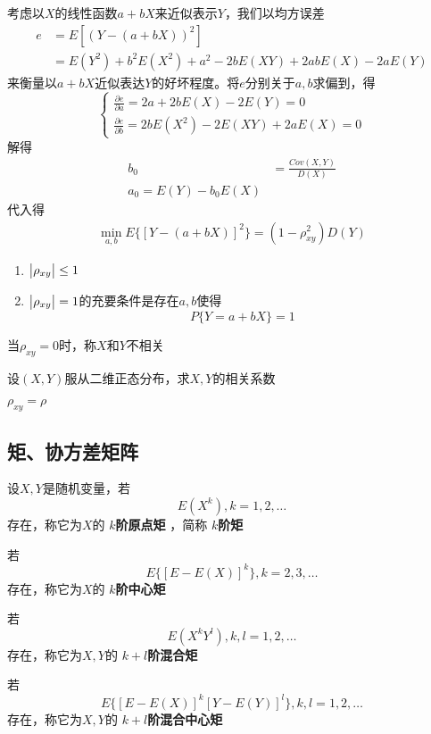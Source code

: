\documentclass[11pt]{article}
\begin{document}
考虑以\(X\)的线性函数\(a+bX\)来近似表示\(Y\)，我们以均方误差
\begin{align*}
e&=E[(Y-(a+bX))^2]\\
&=E(Y^2)+b^2E(X^2)+a^2-2bE(XY)+2abE(X)-2aE(Y)
\end{align*}
来衡量以\(a+bX\)近似表达\(Y\)的好坏程度。将\(e\)分别关于\(a,b\)求偏到，得
\begin{equation*}
\begin{cases}
\frac{\partial e}{\partial a}=2a+2bE(X)-2E(Y)=0\\
\frac{\partial e}{\partial b}=2bE(X^2)-2E(XY)+2aE(X)=0
\end{cases}
\end{equation*}
解得
\begin{align*}
b_0&=\frac{Cov(X,Y)}{D(X)}\\
a_0=E(Y)-b_0E(X)
\end{align*}
代入得
\begin{align*}
\min_{a,b}E\{[Y-(a+bX)]^2\}=(1-\rho^2_{xy})D(Y)
\end{align*}
\begin{theorem}[]
\begin{enumerate}
\item \(\abs{\rho_{xy}}\le1\)
\item \(\abs{\rho_{xy}}=1\)的充要条件是存在\(a,b\)使得
\begin{equation*}
P\{Y=a+bX\}=1
\end{equation*}
\end{enumerate}
\end{theorem}

当\(\rho_{xy}=0\)时，称\(X\)和\(Y\)不相关

\begin{examplle}[]
设\((X,Y)\)服从二维正态分布，求\(X,Y\)的相关系数

\(\rho_{xy}=\rho\)
\end{examplle}
\subsection{矩、协方差矩阵}
\label{sec:orgfc91084}
\begin{definition}[]
设\(X,Y\)是随机变量，若
\begin{equation*}
E(X^k),k=1,2,\dots
\end{equation*}
存在，称它为\(X\)的 \textbf{\(k\)阶原点矩} ，简称 \textbf{\(k\)阶矩}

若
\begin{equation*}
E\{[E-E(X)]^k\},k=2,3,\dots
\end{equation*}
存在，称它为\(X\)的 \textbf{\(k\)阶中心矩}

若
\begin{equation*}
E(X^kY^l),k,l=1,2,\dots
\end{equation*}
存在，称它为\(X,Y\)的 \textbf{\(k+l\)阶混合矩}

若
\begin{equation*}
E\{[E-E(X)]^k[Y-E(Y)]^l\},k,l=1,2,\dots
\end{equation*}
存在，称它为\(X,Y\)的 \textbf{\(k+l\)阶混合中心矩}
\end{definition}
\end{document}
